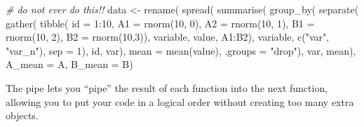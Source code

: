 \documentclass[
  oneside]{book}
\newenvironment{Shaded}{\begin{snugshade}}{\end{snugshade}}
\newcommand{\AttributeTok}[1]{\textcolor[rgb]{0.77,0.63,0.00}{#1}}
\newcommand{\CommentTok}[1]{\textcolor[rgb]{0.56,0.35,0.01}{\textit{#1}}}
\newcommand{\DecValTok}[1]{\textcolor[rgb]{0.00,0.00,0.81}{#1}}
\newcommand{\FunctionTok}[1]{\textcolor[rgb]{0.00,0.00,0.00}{#1}}
\newcommand{\NormalTok}[1]{#1}
\newcommand{\OtherTok}[1]{\textcolor[rgb]{0.56,0.35,0.01}{#1}}
\newcommand{\SpecialCharTok}[1]{\textcolor[rgb]{0.00,0.00,0.00}{#1}}
\newcommand{\StringTok}[1]{\textcolor[rgb]{0.31,0.60,0.02}{#1}}
\begin{document}
\begin{Shaded}
\begin{Highlighting}[]
\CommentTok{\# do not ever do this!!}
\NormalTok{data }\OtherTok{\textless{}{-}} \FunctionTok{rename}\NormalTok{(}
  \FunctionTok{spread}\NormalTok{(}
    \FunctionTok{summarise}\NormalTok{(}
      \FunctionTok{group\_by}\NormalTok{(}
        \FunctionTok{separate}\NormalTok{(}
          \FunctionTok{gather}\NormalTok{(}
            \FunctionTok{tibble}\NormalTok{(}
              \AttributeTok{id =} \DecValTok{1}\SpecialCharTok{:}\DecValTok{10}\NormalTok{,}
              \AttributeTok{A1 =} \FunctionTok{rnorm}\NormalTok{(}\DecValTok{10}\NormalTok{, }\DecValTok{0}\NormalTok{),}
              \AttributeTok{A2 =} \FunctionTok{rnorm}\NormalTok{(}\DecValTok{10}\NormalTok{, }\DecValTok{1}\NormalTok{),}
              \AttributeTok{B1 =} \FunctionTok{rnorm}\NormalTok{(}\DecValTok{10}\NormalTok{, }\DecValTok{2}\NormalTok{),}
              \AttributeTok{B2 =} \FunctionTok{rnorm}\NormalTok{(}\DecValTok{10}\NormalTok{,}\DecValTok{3}\NormalTok{)), }
\NormalTok{            variable, value, A1}\SpecialCharTok{:}\NormalTok{B2), }
\NormalTok{          variable, }\FunctionTok{c}\NormalTok{(}\StringTok{"var"}\NormalTok{, }\StringTok{"var\_n"}\NormalTok{), }\AttributeTok{sep =} \DecValTok{1}\NormalTok{), }
\NormalTok{        id, var), }
      \AttributeTok{mean =} \FunctionTok{mean}\NormalTok{(value), }\AttributeTok{.groups =} \StringTok{"drop"}\NormalTok{), }
\NormalTok{    var, mean), }
  \AttributeTok{A\_mean =}\NormalTok{ A, }\AttributeTok{B\_mean =}\NormalTok{ B)}
\end{Highlighting}
\end{Shaded}

The pipe lets you ``pipe'' the result of each function into the next function, allowing you to put your code in a logical order without creating too many extra objects.
\end{document}
